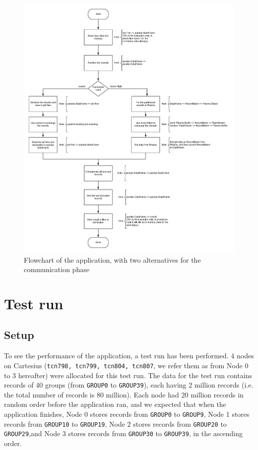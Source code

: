 \documentclass{article}
\begin{document}
\begin{figure}[h!]
    \centering
    \includegraphics[width=1.2\textwidth]{flowchart}
    \caption{Flowchart of the application, with two alternatives for the communication phase}
    \label{fig:flowchart}
\end{figure}

\section{Test run}
\label{sec:test_run}

\subsection{Setup}
To see the performance of the application, a test run has been performed.
4 nodes on Cartesius (\texttt{tcn798, tcn799, tcn804, tcn807}, we refer them as from Node 0 to 3 hereafter) were allocated for this test run.
The data for the test run contains records of 40 groups (from \texttt{GROUP0} to \texttt{GROUP39}), each having 2 million records (i.e. the total number of records is 80 million).
Each node had 20 million records in random order before the application ran, and we expected that when the application finishes,
Node 0 stores records from \texttt{GROUP0} to \texttt{GROUP9},
Node 1 stores records from \texttt{GROUP10} to \texttt{GROUP19},
Node 2 stores records from \texttt{GROUP20} to \texttt{GROUP29},and
Node 3 stores records from \texttt{GROUP30} to \texttt{GROUP39}, in the ascending order.
\end{document}
